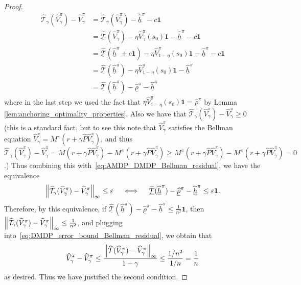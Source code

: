 \documentclass{article}
\theoremstyle{plain}
\theoremstyle{plain}
\theoremstyle{remark}
\theoremstyle{plain}
\theoremstyle{plain}
\newcommand{\Phat}{\widehat{P}}
\newcommand{\Vhat}{\widehat{V}}
\newcommand{\one}{\mathbf{1}}
\newcommand{\rhohat}{\widehat{\rho}}
\newcommand{\hhat}{\widehat{h}}
\newcommand{\rhohatanc}{ \underline{\rhohat}}
\newcommand{\hhatanc}{\underline{\hhat}}
\newcommand{\Thatanc}{\underline{\widehat{\mathcal{T}}}}
\newcommand{\That}{\widehat{\mathcal{T}}}
\begin{document}
\begin{proof}
\begin{align}
            \That_\gamma (\Vhat_\gamma^\pi) - \Vhat_\gamma^\pi &= \That_\gamma (\Vhat_\gamma^\pi) - \hhatanc^\pi - c \one \nonumber\\
            &= \Thatanc (\Vhat_\gamma^\pi) - \eta \Vhat_\gamma^\pi(s_0)\one - \hhatanc^\pi - c \one \nonumber \\
            &= \Thatanc ( \hhatanc^\pi + c \one) - \eta \Vhat_{1-\eta}^\pi(s_0)\one - \hhatanc^\pi - c \one \nonumber \\
            &= \Thatanc ( \hhatanc^\pi) - \eta \Vhat_{1-\eta}^\pi(s_0)\one - \hhatanc^\pi \nonumber \\
            &= \Thatanc ( \hhatanc^\pi) - \rhohatanc^\pi - \hhatanc^\pi \label{eq:AMDP_DMDP_Bellman_residual}
        \end{align}
        where in the last step we used the fact that $\eta \Vhat_{1-\eta}^\pi(s_0)\one = \rhohatanc^\pi$ by Lemma \ref{lem:anchoring_optimality_properties}. Also we have that $\That_\gamma (\Vhat_\gamma^\pi) - \Vhat_\gamma^\pi \geq 0$ (this is a standard fact, but to see this note that $\Vhat_\gamma^\pi$ satisfies the Bellman equation $\Vhat_\gamma^\pi = M^\pi(r + \gamma \Phat \Vhat_\gamma^\pi)$, and thus $\That_\gamma (\Vhat_\gamma^\pi) - \Vhat_\gamma^\pi = M(r + \gamma \Phat \Vhat_\gamma^\pi) - M^\pi(r + \gamma \Phat \Vhat_\gamma^\pi) \geq M^\pi(r + \gamma \Phat \Vhat_\gamma^\pi) - M^\pi(r + \gamma \Phat \Vhat_\gamma^\pi) = 0$.) Thus combining this with~\eqref{eq:AMDP_DMDP_Bellman_residual}, we have the equivalence
        \begin{align*}
            \infnorm{ \That_\gamma (\Vhat_\gamma^\pi) - \Vhat_\gamma^\pi} \leq \varepsilon \quad \iff \quad \Thatanc ( \hhatanc^\pi) - \rhohatanc^\pi - \hhatanc^\pi \leq \varepsilon \one.
        \end{align*}
        Therefore, by this equivalence, if $\Thatanc ( \hhatanc^\pi) - \rhohatanc^\pi - \hhatanc^\pi \leq \frac{1}{n^2} \one$, then $\infnorm{ \That_\gamma (\Vhat_\gamma^\pi) - \Vhat_\gamma^\pi} \leq \frac{1}{n^2}$, and plugging into~\eqref{eq:DMDP_error_bound_Bellman_residual}, we obtain that
        \[
            \Vhat_\gamma^\star - \Vhat_\gamma^\pi  \leq \frac{\infnorm{\That(\Vhat_\gamma^\pi) - \Vhat_\gamma^\pi}}{1-\gamma} \leq \frac{1/n^2}{1/n} = \frac{1}{n}
        \]
        as desired. Thus we have justified the second condition.


\end{proof}
\end{document}
